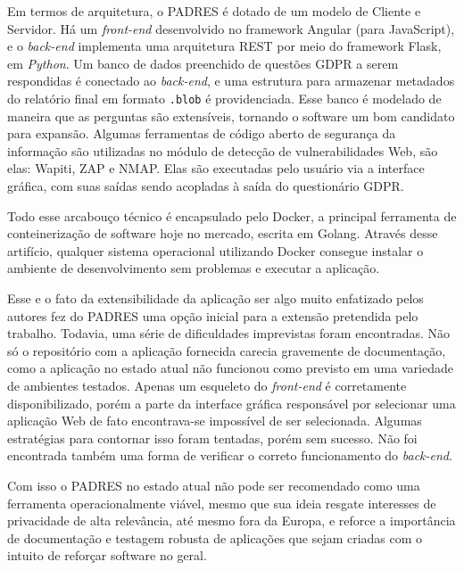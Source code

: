 Em termos de arquitetura, o PADRES é dotado de um modelo de Cliente e Servidor. Há um \textit{front-end} desenvolvido no framework Angular (para JavaScript), e o \textit{back-end} implementa uma arquitetura REST por meio do framework Flask, em \textit{Python}. Um banco de dados preenchido de questões GDPR a serem respondidas é conectado ao \textit{back-end}, e uma estrutura para armazenar metadados do relatório final em formato \verb+.blob+ é providenciada. Esse banco é modelado de maneira que as perguntas são extensíveis, tornando o software um bom candidato para expansão. Algumas ferramentas de código aberto de segurança da informação são utilizadas no módulo de detecção de vulnerabilidades Web, são elas: Wapiti, ZAP e NMAP. Elas são executadas pelo usuário via a interface gráfica, com suas saídas sendo acopladas à saída do questionário GDPR.

Todo esse arcabouço técnico é encapsulado pelo Docker, a principal ferramenta de conteinerização de software hoje no mercado, escrita em Golang. Através desse artifício, qualquer sistema operacional utilizando Docker consegue instalar o ambiente de desenvolvimento sem problemas e executar a aplicação.

Esse e o fato da extensibilidade da aplicação ser algo muito enfatizado pelos autores fez do PADRES uma opção inicial para a extensão pretendida pelo trabalho. Todavia, uma série de dificuldades imprevistas foram encontradas. Não só o repositório com a aplicação fornecida carecia gravemente de documentação, como a aplicação no estado atual não funcionou como previsto em uma variedade de ambientes testados. Apenas um esqueleto do \textit{front-end} é corretamente disponibilizado, porém a parte da interface gráfica responsável por selecionar uma aplicação Web de fato encontrava-se impossível de ser selecionada. Algumas estratégias para contornar isso foram tentadas, porém sem sucesso. Não foi encontrada também uma forma de verificar o correto funcionamento do \textit{back-end}.

Com isso o PADRES no estado atual não pode ser recomendado como uma ferramenta operacionalmente viável, mesmo que sua ideia resgate interesses de privacidade de alta relevância, até mesmo fora da Europa, e reforce a importância de documentação e testagem robusta de aplicações que sejam criadas com o intuito de reforçar software no geral. 

